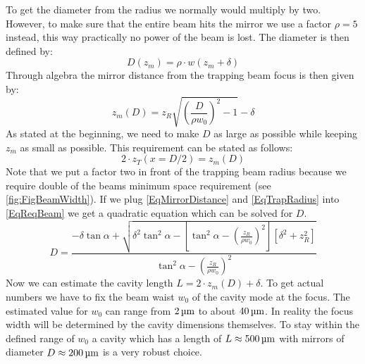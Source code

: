 To get the diameter from the radius we normally would multiply by two. However, to make sure that the entire beam hits the mirror we use a factor $\rho = 5$ instead, this way practically no power of the beam is lost. The diameter is then defined by:
\begin{equation}\label{BeamDiameter}
	D(z_{\si{m}})=\rho\cdot w(z_{\si{m}}+\delta)
\end{equation}
Through algebra the mirror distance from the trapping beam focus is then given by:
\begin{equation}\label{EqMirrorDistance}
	z_{\si{m}}(D)=z_{\si{R}}\sqrt{\left(\frac{D}{\rho w_0}\right)^2-1}-\delta
\end{equation}
As stated at the beginning, we need to make $D$ as large as possible while keeping $z_{\si{m}}$ as small as possible. This requirement can be stated as follows:
\begin{equation}\label{EqReqBeam}
	2\cdot z_{\si{T}}(x=D/2)=z_{\si{m}}(D)
\end{equation}
Note that we put a factor two in front of the trapping beam radius because we require double of the beams minimum space requirement (see \autoref{fig:FigBeamWidth}). If we plug \autoref{EqMirrorDistance} and \autoref{EqTrapRadius} into \autoref{EqReqBeam} we get a quadratic equation which can be solved for $D$.
\begin{equation}
	D=\frac{-\delta\tan\alpha+\sqrt{\delta^2\tan^2\alpha -\left[\tan^2\alpha-\left(\frac{z_{\si{R}}}{\rho w_0}\right)^2\right]\left[\delta^2+z_{\si{R}}^2\right]}}{\tan^2\alpha-\left(\frac{z_{\si{R}}}{\rho w_0}\right)^2}
\end{equation}
Now we can estimate the cavity length $L=2\cdot z_{\si{m}}(D)+\delta$. To get actual numbers we have to fix the beam waist $w_0$ of the cavity mode at the focus. The estimated value for $w_0$ can range from $2\um$ to about $40\um$. In reality the focus width will be determined by the cavity dimensions themselves. To stay within the defined range of $w_0$ a cavity which has a length of $L\approx 500\um$ with mirrors of diameter $D\approx 200\um$ is a very robust choice.

